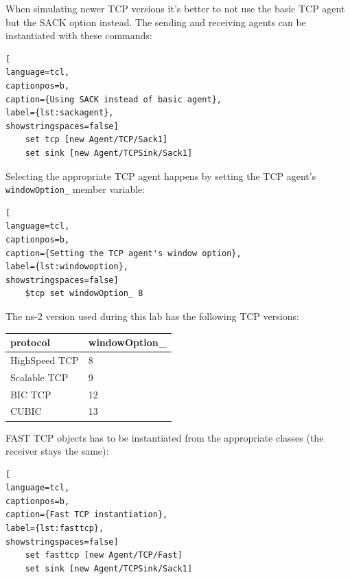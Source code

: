 \documentclass[a4paper]{article}
\begin{document}
When simulating newer TCP versions it's better to not use the basic TCP agent but the SACK option instead. The sending
and receiving agents can be instantiated with these commands:

\begin{lstlisting}[
language=tcl,
captionpos=b,
caption={Using SACK instead of basic agent},
label={lst:sackagent},
showstringspaces=false]
    set tcp [new Agent/TCP/Sack1]
    set sink [new Agent/TCPSink/Sack1]
\end{lstlisting}

Selecting the appropriate TCP agent happens by setting the TCP agent's \verb!windowOption_! member variable:

\begin{lstlisting}[
language=tcl,
captionpos=b,
caption={Setting the TCP agent's window option},
label={lst:windowoption},
showstringspaces=false]
    $tcp set windowOption_ 8
\end{lstlisting}

The ns-2 version used during this lab has the following TCP versions:

\begin{tabular}{|l|l|}
    \hline
    \cellcolor{blue!25} \textbf{protocol} & \cellcolor{blue!25} \textbf{windowOption\_}  \\\hline
    HighSpeed TCP                         & 8                                            \\\hline
    Scalable TCP                          & 9                                            \\\hline
    BIC TCP                               & 12                                           \\\hline
    CUBIC                                 & 13                                           \\\hline
\end{tabular}

\hfill \break
FAST TCP objects has to be instantiated from the appropriate classes (the receiver stays the same):

\begin{lstlisting}[
language=tcl,
captionpos=b,
caption={Fast TCP instantiation},
label={lst:fasttcp},
showstringspaces=false]
    set fasttcp [new Agent/TCP/Fast]
    set sink [new Agent/TCPSink/Sack1]
\end{lstlisting}




\appendix
\end{document}
